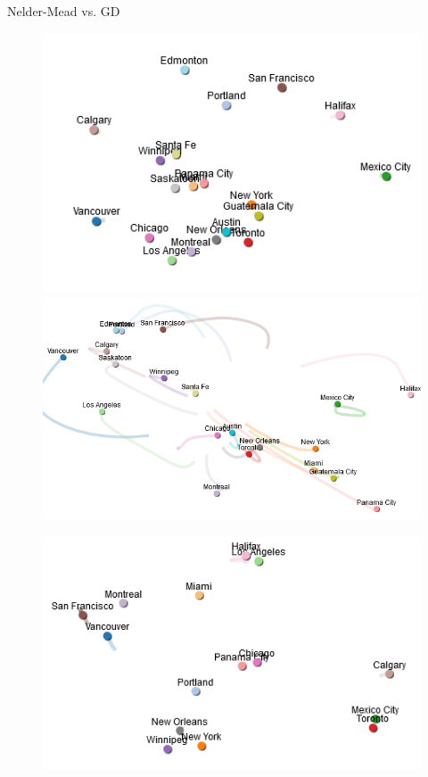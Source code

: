 \documentclass[11pt,compress,t,notes=noshow, xcolor=table]{beamer}
\begin{document}
\begin{vbframe}{Nelder-Mead vs. GD}
\vspace*{-0.5cm}
\begin{figure}
    \centering
    \begin{minipage}{0.45\textwidth}
        \centering
        \includegraphics[width = 0.8\linewidth]{figure_man/nm_gd_cities_1.PNG}
    \end{minipage}\hfill
    \begin{minipage}{0.45\textwidth}
        \centering
        \includegraphics[width = 0.8\linewidth]{figure_man/nm_gd_cities_2.PNG}
    \end{minipage}
\end{figure}
\begin{figure}
    \centering
    \begin{minipage}{0.45\textwidth}
        \centering
        \includegraphics[width = 0.8\linewidth]{figure_man/nm_gd_cities_3.PNG}

\end{minipage}
\end{figure}
\end{vbframe}
\end{document}
